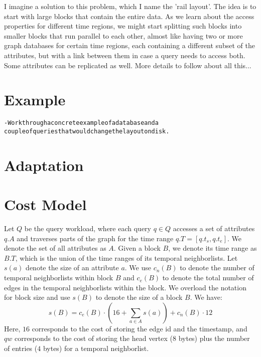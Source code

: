 \documentclass{sig-alternate}
\begin{document}
I imagine a solution to this problem, which I name the 'rail layout'. The idea
is to start with large blocks that contain the entire data. As we learn about
the access properties for different time regions, we might start splitting
such blocks into smaller blocks that run parallel to each other, almost like
having two or more graph databases for certain time regions, each containing a
 different subset of the attributes, but with a link between them in case a
query needs to access both. Some attributes can be replicated as well. 
More details to follow about all this...

\section{Example}

\begin{alltt}\scriptsize
- Work through a concrete example of a database and a 
   couple of queries that would change the layout on disk.
\end{alltt}




\section{Adaptation}

\section{Cost Model}

Let $Q$ be the query workload, where each query $q\in Q$ accesses a set of
attributes $q.A$ and traverses parts of the graph for the time range
$q.T=[q.t_s,q.t_e]$. We denote the set of all attributes as $A$. Given a block
$B$, we denote its time range as $B.T$, which is the union of the time ranges
of its temporal neighborlists. Let $s(a)$ denote the size of an attribute $a$.
We use $c_n(B)$ to denote the number of temporal neighborlists within block
$B$ and $c_e(B)$ to denote the total number of edges in the temporal
neighborlists within the block. We overload the notation for block size and
use $s(B)$ to denote the size of a block $B$. We have: 
\begin{equation}
s(B) = c_e(B) \cdot \left(16 + \sum_{a\in A} s(a)\right) + c_n(B) \cdot 12  
\end{equation}
Here, $16$ corresponds to the cost of storing the edge id and the timestamp,
and $qw$ corresponds to the cost of storing the head vertex ($8$ bytes) plus
the number of entries ($4$ bytes) for a temporal neighborlist. 
\end{document}
